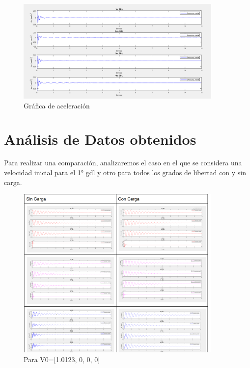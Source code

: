 \documentclass{aleph-revista}
\begin{document}
\begin{figure}[H]
    \centering
    \includegraphics[width=0.90\textwidth]{Imagenes/r30.png}
    \caption{Gráfica de aceleración}
    \label{fig:etiqueta de la figura}
\end{figure}

\section{Análisis de Datos obtenidos}

Para realizar una comparación, analizaremos el caso en el que se considera una velocidad inicial para el 1° gdl y otro para todos los grados de libertad con y sin carga.

\begin{figure}[H]
    \centering
    \includegraphics[width=0.90\textwidth]{Imagenes/V01GDL.png}
    \caption{Para V0=[1.0123, 0, 0, 0]}
    \label{fig:etiqueta de la figura}
\end{figure}
\end{document}
